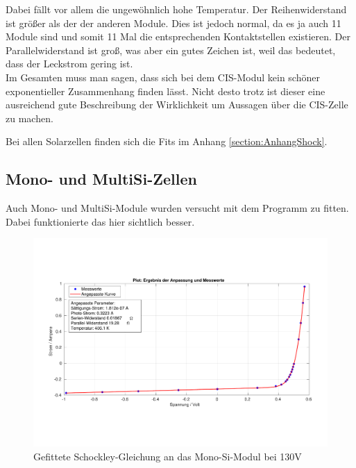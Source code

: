 Dabei fällt vor allem die ungewöhnlich hohe Temperatur. Der Reihenwiderstand ist größer als der der anderen Module. Dies ist jedoch normal, da 
es ja auch 11 Module sind und somit 11 Mal die entsprechenden Kontaktstellen existieren. Der Parallelwiderstand ist groß, was aber ein gutes 
Zeichen ist, weil das bedeutet, dass der Leckstrom gering ist.\\
Im Gesamten muss man sagen, dass sich bei dem CIS-Modul kein schöner exponentieller Zusammenhang finden lässt. Nicht desto trotz ist dieser 
eine ausreichend gute Beschreibung der Wirklichkeit um Aussagen über die CIS-Zelle zu machen.

Bei allen Solarzellen finden sich die Fits im Anhang \ref{section:AnhangShock}.




\subsection{Mono- und MultiSi-Zellen}

Auch Mono- und MultiSi-Module wurden versucht mit dem Programm zu fitten. Dabei funktionierte das hier sichtlich besser.

\begin{figure}[ht]
    \centering
    \includegraphics[width = \linewidth]{Bilder/SiMono130Plot.pdf}
    \caption{Gefittete Schockley-Gleichung an das Mono-Si-Modul bei 130V}
\end{figure}

